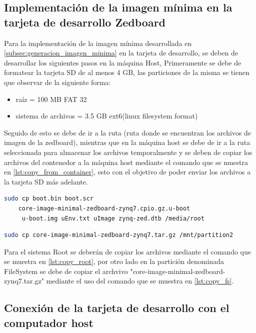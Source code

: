 \subsection{Implementación de la imagen mínima en la tarjeta de desarrollo Zedboard}\label{sub:image2zedboard}

Para la implementación de la imagen mínima desarrollada en \ref{subsec:generacion_imagen_minima} en la tarjeta de desarrollo, se deben de desarrollar los siguientes pasos en la máquina Host, Primeramente se debe de formatear la tarjeta SD de al menos 4 GB, las particiones de la misma se tienen que observar de la siguiente forma:

\begin{itemize}
    \item raíz = 100 MB FAT 32
    \item sistema de archivos = 3.5 GB ext6(linux filesystem format)
\end{itemize} 

Seguido de esto se debe de ir a la ruta (ruta donde se encuentran los archivos de imagen de la zedboard), mientras que en la máquina host se debe de ir a la ruta seleccionada para almacenar los archivos temporalmente y se deben de copiar los archivos del contenedor a la máquina host mediante el comando que se muestra en \ref{lst:copy_from_container}, esto con el objetivo de poder enviar los archivos a la tarjeta SD más adelante.

\begin{lstlisting}[language=bash, caption={Copiar archivos root, Linux}, label=lst:copy_root]
    sudo cp boot.bin boot.scr 
    core-image-minimal-zedboard-zynq7.cpio.gz.u-boot
     u-boot.img uEnv.txt uImage zynq-zed.dtb /media/root
\end{lstlisting}

\begin{lstlisting}[language=bash, caption={Copiar sistema de archivos, Linux}, label=lst:copy_fs]
    sudo cp core-image-minimal-zedboard-zynq7.tar.gz /mnt/partition2
\end{lstlisting}

Para el sistema Root se deberán de copiar los archivos mediante el comando que se muestra en \ref{lst:copy_root}, por otro lado en la partición denominada FileSystem se debe de copiar el archvivo "core-image-minimal-zedboard-zynq7.tar.gz" mediante el uso del comando que se muestra en \ref{lst:copy_fs}.

\subsection{Conexión de la tarjeta de desarrollo con el computador host}

